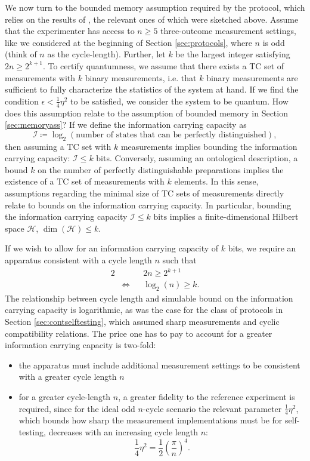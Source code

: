 We now turn to the bounded memory assumption required by the protocol, which relies on the results of \cite{Pusey2019a}, the relevant ones of which were sketched above. Assume that the experimenter has access to $n\geq 5$ three-outcome measurement settings, like we considered at the beginning of Section \ref{sec:protocols}, where $n$ is odd (think of $n$ as the cycle-length). Further, let $k$ be the largest integer satisfying $2n\geq 2^{k+1}$. To certify quantumness, we assume that there exists a TC set of measurements with $k$ binary measurements, i.e. that $k$ binary measurements are sufficient to fully characterize the statistics of the system at hand. If we find the condition $\epsilon<\frac{1}{4}\eta^2$ to be satisfied, we consider the system to be quantum.  How does this assumption relate to the assumption of bounded memory in Section \ref{sec:memoryass}? If we define the information carrying capacity as 
\begin{equation*}
\mathcal{I}\coloneqq \log_2(\text{number of states that can be perfectly distinguished}),
\end{equation*}
then assuming a TC set with $k$ measurements implies bounding the information carrying capacity: $\mathcal{I}\leq k$ bits. Conversely, assuming an ontological description, a bound $k$ on the number of perfectly distinguishable preparations implies the existence of a TC set of measurements with $k$ elements. In this sense, assumptions regarding the minimal size of TC sets of measurements directly relate to bounds on the information carrying capacity. In particular, bounding the information carrying capacity $\mathcal{I}\leq k \text{ bits}$ implies a finite-dimensional Hilbert space $\mathcal{H}$, $\operatorname{dim}(\mathcal{H})\leq k$.

If we wish to allow for an information carrying capacity of $k$ bits, we require an apparatus consistent with a cycle length $n$ such that
\begin{alignat*}{2}
& && 2n\geq 2^{k+1} \\
& \iff && \log_2(n)\geq k.
\end{alignat*}
The relationship between cycle length and simulable bound on the information carrying capacity is logarithmic, as was the case for the class of protocols in Section \ref{sec:contselftesting}, which assumed sharp measurements and cyclic compatibility relations. The price one has to pay to account for a greater information carrying capacity is two-fold:
\begin{itemize}
\item the apparatus must include additional measurement settings to be consistent with a greater cycle length $n$
\item for a greater cycle-length $n$, a greater fidelity to the reference experiment is required, since for the ideal odd $n$-cycle scenario the relevant parameter $\frac{1}{4}\eta^2$, which bounds how sharp the measurement implementations must be for self-testing, decreases with an increasing cycle length $n$:
\begin{equation*}
\frac{1}{4}\eta^2 = \frac{1}{2}\left(\frac{\pi}{n}\right)^4.
\end{equation*}
\end{itemize}

